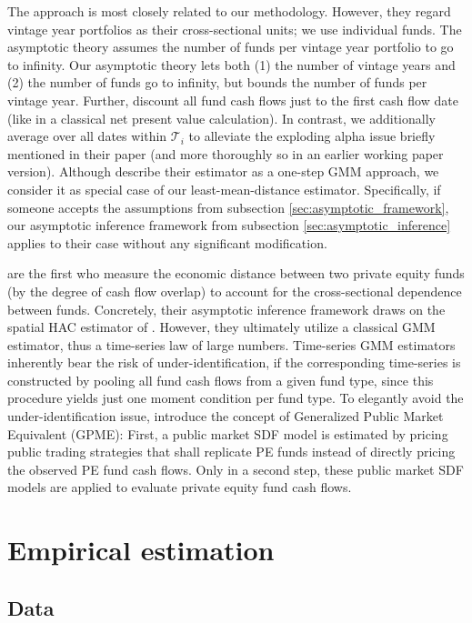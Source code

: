 \documentclass[12pt]{article}
\begin{document}
The \cite{DLP12} approach is most closely related to our methodology.
However, they regard vintage year portfolios as their cross-sectional units; we use individual funds.
The \cite{DLP12} asymptotic theory assumes the number of funds per vintage year portfolio to go to infinity.
Our asymptotic theory lets both (1) the number of vintage years and (2) the number of funds go to infinity, but bounds the number of funds per vintage year.
Further, \cite{DLP12} discount all fund cash flows just to the first cash flow date (like in a classical net present value calculation).
In contrast, we additionally average over all dates within $\mathcal{T}_{i}$ to alleviate the exploding alpha issue briefly mentioned in their paper (and more thoroughly so in an earlier working paper version).
Although \cite{DLP12} describe their estimator as a one-step GMM approach, we consider it as special case of our least-mean-distance estimator.
Specifically, if someone accepts the assumptions from subsection \ref{sec:asymptotic_framework}, our asymptotic inference framework from subsection \ref{sec:asymptotic_inference} applies to their case without any significant modification.

\cite{KN16} are the first who measure the economic distance between two private equity funds (by the degree of cash flow overlap) to account for the cross-sectional dependence between funds.
Concretely, their asymptotic inference framework draws on the spatial HAC estimator of \cite{C99}.
However, they ultimately utilize a classical GMM estimator, thus a time-series law of large numbers.
Time-series GMM estimators inherently bear the risk of under-identification, if the corresponding time-series is constructed by pooling all fund cash flows from a given fund type, since this procedure yields just one moment condition per fund type.
To elegantly avoid the under-identification issue, \cite{KN16} introduce the concept of Generalized Public Market Equivalent (GPME):
First, a public market SDF model is estimated by pricing public trading strategies that shall replicate PE funds instead of directly pricing the observed PE fund cash flows.
Only in a second step, these public market SDF models are applied to evaluate private equity fund cash flows.

\section{Empirical estimation}
\label{sec:empirical_estimation}

\subsection{Data}
\end{document}
